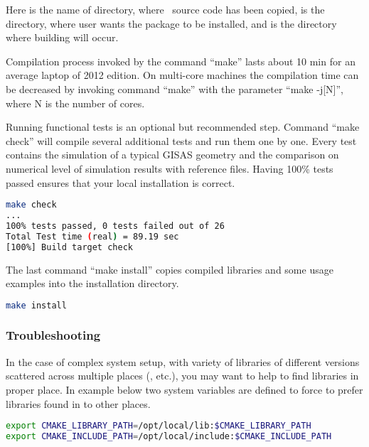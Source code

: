 Here  is the name of directory, where \BornAgain\ source code has been
copied,  is the directory, where user wants  the package
to be installed, and  is the directory where building will occur.



Compilation process invoked by the command ``make'' lasts about 10 min for an average laptop
of 2012 edition. On multi-core machines the compilation time  can be decreased by invoking command
``make'' with the parameter ``make -j[N]'', where N is the number of cores.

Running functional tests is an optional but recommended step. Command ``make check''
will compile several additional tests and run them one by one. Every test contains
the simulation of a typical GISAS geometry and the comparison on numerical level of simulation results with reference files. Having 100\% tests passed ensures that your local installation
is correct.
\begin{lstlisting}[language=bash, style=commandline]
make check
...
100% tests passed, 0 tests failed out of 26
Total Test time (real) = 89.19 sec
[100%] Build target check
\end{lstlisting}
\vspace*{3mm}


The last command ``make install'' copies compiled libraries and some usage examples
into  the installation directory.
\begin{lstlisting}[language=bash, style=commandline]
make install
\end{lstlisting}


\subsubsection{Troubleshooting}

In the case of complex system setup, with variety of libraries of different versions 
scattered across multiple places (,  etc.),
you may want to help  to find libraries in proper place. 
In example below
two system variables are defined to force  to prefer libraries
found in  to other places.
\begin{lstlisting}[language=bash, style=commandline]
export CMAKE_LIBRARY_PATH=/opt/local/lib:$CMAKE_LIBRARY_PATH
export CMAKE_INCLUDE_PATH=/opt/local/include:$CMAKE_INCLUDE_PATH
\end{lstlisting}


